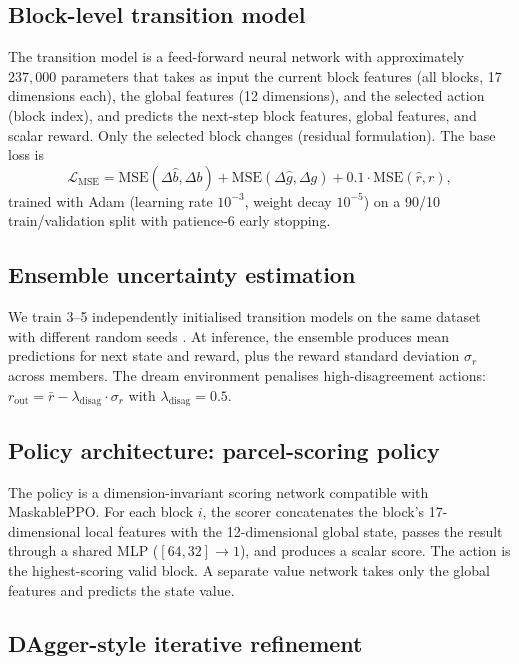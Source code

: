 \documentclass[11pt]{article}
\begin{document}
\subsection*{Block-level transition model}

The transition model is a feed-forward neural network with approximately $237{,}000$ parameters that takes as input the current block features (all blocks, 17 dimensions each), the global features (12 dimensions), and the selected action (block index), and predicts the next-step block features, global features, and scalar reward. Only the selected block changes (residual formulation). The base loss is
\begin{equation}
\mathcal{L}_{\text{MSE}} = \mathrm{MSE}(\Delta\hat{b}, \Delta b) + \mathrm{MSE}(\Delta\hat{g}, \Delta g) + 0.1 \cdot \mathrm{MSE}(\hat{r}, r),
\end{equation}
trained with Adam (learning rate $10^{-3}$, weight decay $10^{-5}$) on a 90/10 train/validation split with patience-6 early stopping.

\subsection*{Ensemble uncertainty estimation}

We train 3--5 independently initialised transition models on the same dataset with different random seeds \citep{lakshminarayanan2017simple}. At inference, the ensemble produces mean predictions for next state and reward, plus the reward standard deviation $\sigma_r$ across members. The dream environment penalises high-disagreement actions: $r_{\text{out}} = \bar{r} - \lambda_{\text{disag}} \cdot \sigma_r$ with $\lambda_{\text{disag}} = 0.5$.

\subsection*{Policy architecture: parcel-scoring policy}

The policy is a dimension-invariant scoring network compatible with MaskablePPO. For each block $i$, the scorer concatenates the block's 17-dimensional local features with the 12-dimensional global state, passes the result through a shared MLP ($[64, 32] \to 1$), and produces a scalar score. The action is the highest-scoring valid block. A separate value network takes only the global features and predicts the state value.

\subsection*{DAgger-style iterative refinement}
\end{document}
